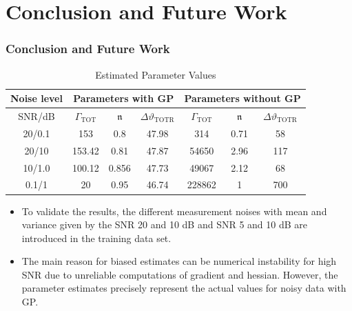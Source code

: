 \documentclass[10pt,hyperref={pdfpagelabels=false}]{beamer}
\begin{document}
\section{Conclusion and Future Work}
\begin{frame}[fragile]
\frametitle{Conclusion and Future Work}
\begin{table} %
\centering %
\begingroup
\arrayrulecolor{}
	\begin{tabular}{ccccccc}
		\hline
Noise level & \multicolumn{3}{c}{Parameters  with GP}  & \multicolumn{3}{c}{Parameters without GP}\\ \hline
	SNR/dB	& $\Gamma_{\mathrm{TOT}}$ & $\boldsymbol{\mathfrak{n}}$ & $\Delta\vartheta_{\mathrm{TOTR}}$ & $\Gamma_{\mathrm{TOT}}$ & $\boldsymbol{\mathfrak{n}}$ & $\Delta\vartheta_{\mathrm{TOTR}}$ \\
	    \hline
	   20/0.1 & 153 & 0.8 & 47.98 &  314& 0.71 & 58\\
	   20/10  & 153.42 &0.81 & 47.87 & 54650& 2.96& 117\\
	    10/1.0 & 100.12 & 0.856 & 47.73 & 49067& 2.12& 68\\
	    0.1/1 & 20 & 0.95 & 46.74& 228862& 1& 700\\
\hline%
\end{tabular}
\endgroup
\caption{Estimated Parameter Values}
\label{Comparisontable}
\end{table}
\begin{itemize}
    \item  To validate the results, the different measurement noises with mean and variance given by the  SNR 20 and 10 dB and SNR 5 and 10 dB are introduced in the training data set.
    \item The main reason for biased estimates can be numerical instability for high SNR due to unreliable computations of gradient and hessian. However, the parameter estimates precisely represent the actual values for noisy data with GP.
\end{itemize}
\end{frame}
\end{document}
